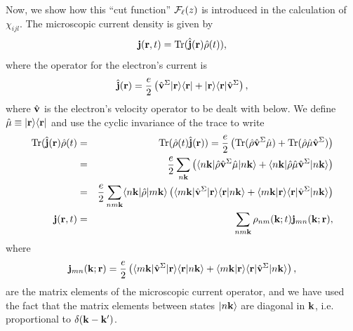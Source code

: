\documentclass{article}
\begin{document}
Now, we show how this ``cut function'' ${\mathbf{\cal F}}_\ell(z)$ is introduced in
the calculation of $\chi_{ijl}$.
The microscopic current density is given by
\begin{equation}\label{jmic}
\mathbf{j}(\mathbf{r},t)=\mathrm{Tr}(\hat{\mathbf{j}}(\mathbf{r})\hat\rho(t)),
\end{equation}
where the operator for the electron's current is
\begin{equation}\label{hatjmic}
\hat{\mathbf{j}}(\mathbf{r})=\frac{e}{2}\left(\hat{\mathbf{v}}^\Sigma| \mathbf{r} \rangle\langle \mathbf{r} |
+| \mathbf{r} \rangle\langle \mathbf{r} |\hat{\mathbf{v}}^\Sigma\right), 
\end{equation}
where $\hat{\mathbf{v}}$ is the electron's velocity operator to be dealt
with below. We define
$\hat\mu\equiv| \mathbf{r} \rangle\langle \mathbf{r} |$ and use the cyclic invariance of
the trace to write
\begin{eqnarray}\label{jmic2}
\mathrm{Tr}(\hat{\mathbf{j}}(\mathbf{r})\hat\rho(t)&=&\mathrm{Tr}(\hat\rho(t)\hat{\mathbf{j}}(\mathbf{r}))=
\frac{e}{2}
\left(
\mathrm{Tr}(\hat\rho\hat{\mathbf{v}}^\Sigma\hat\mu)
+
\mathrm{Tr}(\hat\rho\hat\mu\hat{\mathbf{v}}^\Sigma)
\right)
\nonumber\\
&=&
\frac{e}{2}
\sum_{n\mathbf{k}}
\left(
\langle n\mathbf{k} |\hat\rho\hat{\mathbf{v}}^\Sigma\hat\mu| n\mathbf{k} \rangle
+
\langle n\mathbf{k} |\hat\rho\hat\mu\hat{\mathbf{v}}^\Sigma| n\mathbf{k} \rangle
\right)
\nonumber\\
&=&
\frac{e}{2}
\sum_{nm\mathbf{k}}
\langle n\mathbf{k} |\hat\rho| m\mathbf{k} \rangle
\left(
\langle m\mathbf{k} |\hat{\mathbf{v}}^\Sigma| \mathbf{r} \rangle\langle {\mathbf{r}} | {n\mathbf{k}} \rangle
+
\langle {m\mathbf{k}} | {\mathbf{r}} \rangle\langle \mathbf{r} |\hat{\mathbf{v}}^\Sigma| n\mathbf{k} \rangle
\right)
\nonumber\\
\mathbf{j}(\mathbf{r},t)&=&
\sum_{nm\mathbf{k}}
\rho_{nm}(\mathbf{k};t)\mathbf{j}_{mn}(\mathbf{k};\mathbf{r}),
\end{eqnarray}
where
\begin{equation}\label{jmic3}
\mathbf{j}_{mn}(\mathbf{k};\mathbf{r})=
\frac{e}{2}
\left(
\langle m\mathbf{k} |\hat{\mathbf{v}}^\Sigma| \mathbf{r} \rangle\langle {\mathbf{r}} | {n\mathbf{k}} \rangle
+
\langle {m\mathbf{k}} | {\mathbf{r}} \rangle\langle \mathbf{r} |\hat{\mathbf{v}}^\Sigma| n\mathbf{k} \rangle
\right),
\end{equation}
are the matrix elements of the microscopic current operator,
and we have used the fact that the matrix elements between states $| n\mathbf{k} \rangle$
are diagonal in $\mathbf{k}$, i.e. proportional to $\delta(\mathbf{k}-\mathbf{k}')$.
\end{document}
